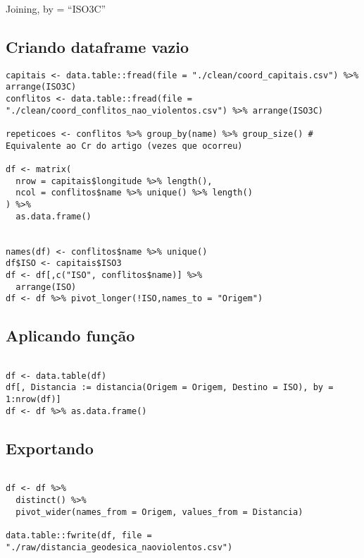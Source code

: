 \documentclass[11pt]{article}
\begin{document}
Joining, by = ``ISO3C''



\subsection*{Criando dataframe vazio}
\label{sec:org19d467e}

\begin{verbatim}
capitais <- data.table::fread(file = "./clean/coord_capitais.csv") %>% arrange(ISO3C)
conflitos <- data.table::fread(file = "./clean/coord_conflitos_nao_violentos.csv") %>% arrange(ISO3C)

repeticoes <- conflitos %>% group_by(name) %>% group_size() # Equivalente ao Cr do artigo (vezes que ocorreu)

df <- matrix(
  nrow = capitais$longitude %>% length(),
  ncol = conflitos$name %>% unique() %>% length()
) %>%
  as.data.frame()


names(df) <- conflitos$name %>% unique()
df$ISO <- capitais$ISO3
df <- df[,c("ISO", conflitos$name)] %>%
  arrange(ISO)
df <- df %>% pivot_longer(!ISO,names_to = "Origem")
\end{verbatim}








\subsection*{Aplicando função}
\label{sec:orgbbe327a}

\begin{verbatim}

df <- data.table(df)
df[, Distancia := distancia(Origem = Origem, Destino = ISO), by = 1:nrow(df)]
df <- df %>% as.data.frame()
\end{verbatim}

\subsection*{Exportando}
\label{sec:orgdf5ba37}

\begin{verbatim}

df <- df %>%
  distinct() %>%
  pivot_wider(names_from = Origem, values_from = Distancia)

data.table::fwrite(df, file = "./raw/distancia_geodesica_naoviolentos.csv")
\end{verbatim}
\end{document}

